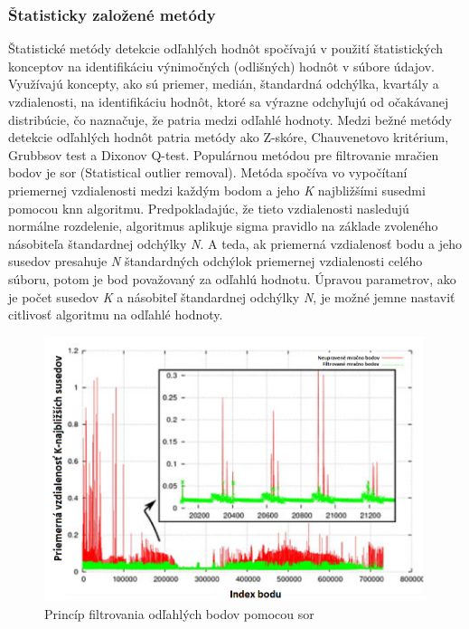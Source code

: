 \subsubsection{Štatisticky založené metódy} \label{section::sor}
\noindent Štatistické metódy detekcie odľahlých hodnôt spočívajú v použití štatistických konceptov na identifikáciu výnimočných (odlišných) hodnôt v súbore údajov. Využívajú koncepty, ako sú priemer, medián, štandardná odchýlka, kvartály a vzdialenosti, na identifikáciu hodnôt, ktoré sa výrazne odchyľujú od očakávanej distribúcie, čo naznačuje, že patria medzi odľahlé hodnoty. Medzi bežné metódy detekcie odľahlých hodnôt patria metódy ako Z-skóre, Chauvenetovo kritérium, Grubbsov test a Dixonov Q-test. 
\newline\indent Populárnou metódou pre filtrovanie mračien bodov je \acrshort{sor} (Statistical outlier removal). Metóda spočíva vo vypočítaní priemernej vzdialenosti medzi každým bodom a jeho \textit{K} najbližšími susedmi pomocou \acrshort{knn} algoritmu. Predpokladajúc, že tieto vzdialenosti nasledujú normálne rozdelenie, algoritmus aplikuje sigma pravidlo na základe zvoleného násobiteľa štandardnej odchýlky \textit{N}. A teda, ak priemerná vzdialenosť bodu a jeho susedov presahuje \textit{N} štandardných odchýlok priemernej vzdialenosti celého súboru, potom je bod považovaný za odľahlú hodnotu. Úpravou parametrov, ako je počet susedov \textit{K} a násobiteľ štandardnej odchýlky \textit{N}, je možné jemne nastaviť citlivosť algoritmu na odľahlé hodnoty. \cite{statistical_filter} 
\begin{figure}[!htbp]
  \centering
  \includegraphics[width=14cm]{img/sor_principal.png}
  \caption{Princíp filtrovania odľahlých bodov pomocou \acrshort{sor} \cite{SOR_img}}
  \label{sor_principal}
\end{figure}

